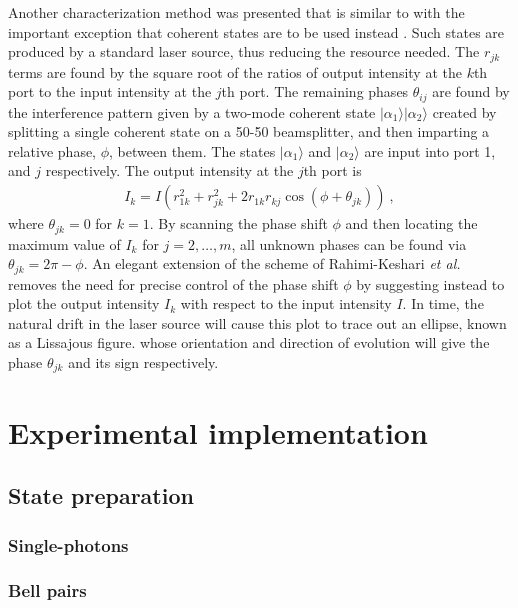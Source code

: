 \documentclass[aps,rmp,twocolumn,amsmath,amssymb,nofootinbib,superscriptaddress]{revtex4}
\newcommand{\ket}[1]{|#1\rangle}
\newcommand{\sihui}[1]{{\color{Orchid}{#1}}}
\begin{document}
Another characterization method was presented that is similar to \cite{bib:Laing12} with the important exception that coherent states are to be used instead \cite{bib:Rahimi-Keshari13,bib:Heilmann15}. Such states are produced by a standard laser source, thus reducing the resource needed. The $r_{jk}$ terms are found by the square root of the ratios of output intensity at the $k$th port to the input intensity at the $j$th port. The remaining phases $\theta_{ij}$ are found by the interference pattern given by a two-mode coherent state $\ket{\alpha_1}\ket{\alpha_2}$ created by splitting a single coherent state on a 50-50 beamsplitter, and then imparting a relative phase, $\phi$, between them. The states $\ket{\alpha_1}$ and $\ket{\alpha_2}$ are input into port 1, and $j$ respectively. The output intensity at the $j$th port is 
\begin{align}
I_k=I(r_{1k}^2+r_{jk}^2+2 r_{1k}r_{kj}\cos(\phi+\theta_{jk})) \ ,
\end{align}
where $\theta_{jk}=0$ for $k=1$. By scanning the phase shift $\phi$ and then locating the maximum value of $I_k$ for $j=2,\ldots, m$, all unknown phases can be found via $\theta_{jk}=2\pi-\phi$. An elegant extension of the scheme of Rahimi-Keshari {\it et al.} removes the need for precise control of the phase shift $\phi$ \cite{bib:Heilmann15} by suggesting instead to plot the output intensity $I_k$ with respect to the input intensity $I$. In time, the natural drift in the laser source will cause this plot to trace out an ellipse, known as a Lissajous figure. whose orientation and direction of evolution will give the phase $\theta_{jk}$ and its sign respectively.

\section{Experimental implementation}

\subsection{State preparation}
\sihui{Cat state--Schoelkopf group}

\subsubsection{Single-photons}

\subsubsection{Bell pairs}
\end{document}
